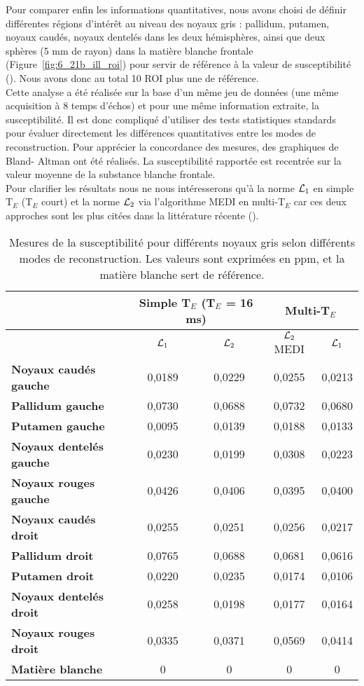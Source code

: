{Pour comparer enfin les informations quantitatives, nous avons choisi de définir différentes
régions d’intérêt au niveau des noyaux gris : pallidum, putamen, noyaux caudés, noyaux dentelés dans
les deux hémisphères, ainsi que deux sphères (5 mm de rayon) dans la matière blanche frontale (Figure~\ref{fig:6_21b_ill_roi}) pour servir de référence à la valeur de susceptibilité (\cite{Schweser2011}). Nous avons donc au total 10 ROI plus
une de référence.\\
Cette analyse a été réalisée sur la base d’un même jeu de données (une même acquisition à 8
temps d’échos) et pour une même information extraite, la susceptibilité. Il est donc compliqué
d’utiliser des tests statistiques standards pour évaluer directement les différences quantitatives entre les modes de reconstruction. Pour apprécier la concordance des mesures, des graphiques de Bland-
Altman ont été réalisés. La susceptibilité rapportée est recentrée sur la valeur moyenne de la substance
blanche frontale.\\
Pour clarifier les résultats nous ne nous intéresserons qu’à la norme ${\cal L}_1$ en simple T$_E$ (T$_E$ court)
et la norme ${\cal L}_2$ via l’algorithme MEDI en multi-T$_E$ car ces deux approches sont les plus citées dans la
littérature récente (\cite{Wang_Liu_2014}).
\begin {table}
\caption{Mesures de la susceptibilité pour différents noyaux gris selon différents modes de reconstruction. Les valeurs
sont exprimées en ppm, et la matière blanche sert de référence.} 
\label{tab:susceptbilite} 
\centering
\begin{tabularx}{\linewidth}{X c c c c}
\hline
 & \multicolumn{2}{c}{{\bf Simple T$_E$ (T$_E$ = 16 ms) }} & \multicolumn{2}{c}{{\bf Multi-T$_E$}} \\
\hline
 & ${\cal L}_1$ & ${\cal L}_2$ & ${\cal L}_2$ MEDI & $ {\cal L}_1$\\
\hline
{\bf Noyaux caudés gauche } & 0,0189  &  0,0229 &  0,0255 & 0,0213 \\
\hline
{\bf Pallidum gauche } & 0,0730  & 0,0688  & 0,0732 & 0,0680 \\
\hline
{\bf Putamen gauche } &  0,0095 &  0,0139 & 0,0188  & 0,0133 \\
\hline
{\bf Noyaux dentelés gauche} & 0,0230  &  0,0199 & 0,0308 &0,0223 \\ 
\hline
{\bf Noyaux rouges gauche } & 0,0426   & 0,0406  &  0,0395 & 0,0400\\ 
\hline
{\bf Noyaux caudés droit } & 0,0255 & 0,0251 &  0,0256 &  0,0217\\
\hline
{\bf Pallidum droit } &0,0765   &  0,0688 &0,0681  & 0,0616 \\
\hline
{\bf Putamen droit } &  0,0220 &  0,0235 & 0,0174 &0,0106\\ 
\hline
{\bf Noyaux dentelés droit} & 0,0258  & 0,0198  & 0,0177& 0,0164 \\ 
\hline
{\bf Noyaux rouges droit } & 0,0335  &  0,0371 & 0,0569  &0,0414 \\ 
\hline
{\bf Matière blanche} &  0&  0&  0& 0\\ 
\hline
\end{tabularx}


\end{table}}
